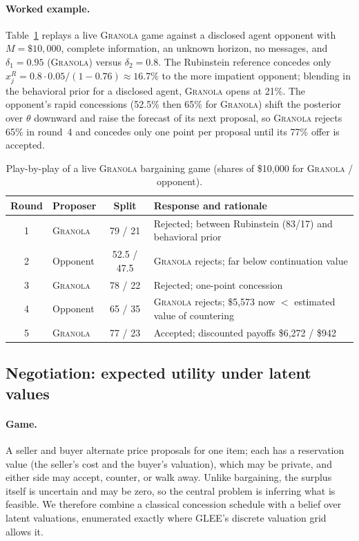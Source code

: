 \documentclass{article}
\newcommand{\competitionname}{\textsc{Granola}}
\begin{document}
\paragraph{Worked example.}
Table~\ref{tab:example} replays a live \competitionname{} game against a disclosed agent opponent with $M=\$10{,}000$, complete information, an unknown horizon, no messages, and $\delta_1=0.95$ (\competitionname{}) versus $\delta_2=0.8$.
The Rubinstein reference concedes only $x^R_j=0.8\cdot0.05/(1-0.76)\approx16.7\%$ to the more impatient opponent; blending in the behavioral prior for a disclosed agent, \competitionname{} opens at 21\%.
The opponent's rapid concessions (52.5\% then 65\% for \competitionname{}) shift the posterior over $\theta$ downward and raise the forecast of its next proposal, so \competitionname{} rejects 65\% in round~4 and concedes only one point per proposal until its 77\% offer is accepted.

\begin{table}[t]
  \caption{Play-by-play of a live \competitionname{} bargaining game (shares of \$10{,}000 for \competitionname{} / opponent).}
  \label{tab:example}
  \centering
  \small
  \begin{tabular}{clcl}
    \toprule
    Round & Proposer & Split & Response and rationale \\
    \midrule
    1 & \competitionname{} & 79 / 21 & Rejected; between Rubinstein (83/17) and behavioral prior \\
    2 & Opponent & 52.5 / 47.5 & \competitionname{} rejects; far below continuation value \\
    3 & \competitionname{} & 78 / 22 & Rejected; one-point concession \\
    4 & Opponent & 65 / 35 & \competitionname{} rejects; \$5{,}573 now $<$ estimated value of countering \\
    5 & \competitionname{} & 77 / 23 & Accepted; discounted payoffs \$6{,}272 / \$942 \\
    \bottomrule
  \end{tabular}
\end{table}

\subsection{Negotiation: expected utility under latent values}
\paragraph{Game.}
A seller and buyer alternate price proposals for one item; each has a reservation value (the seller's cost and the buyer's valuation), which may be private, and either side may accept, counter, or walk away.
Unlike bargaining, the surplus itself is uncertain and may be zero, so the central problem is inferring what is feasible.
We therefore combine a classical concession schedule with a belief over latent valuations, enumerated exactly where GLEE's discrete valuation grid allows it.
\end{document}
